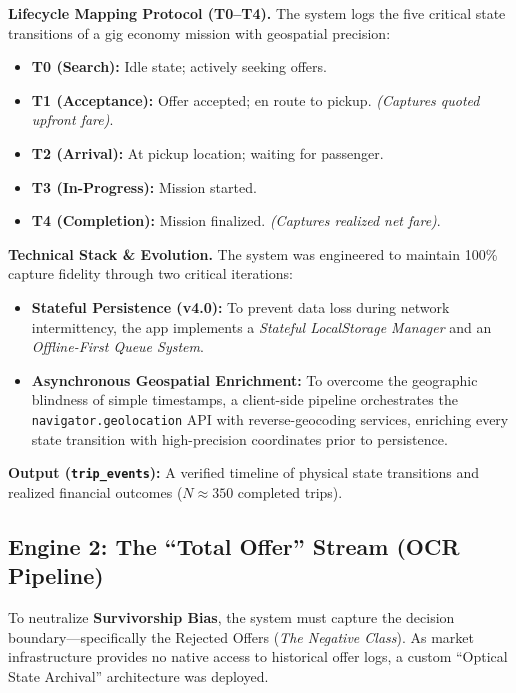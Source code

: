 \medskip
\noindent \textbf{Lifecycle Mapping Protocol (T0--T4).} The system logs the five critical state transitions of a gig economy mission with geospatial precision:
\begin{itemize}[noitemsep, topsep=3pt]
    \item \textbf{T0 (Search):} Idle state; actively seeking offers.
    \item \textbf{T1 (Acceptance):} Offer accepted; en route to pickup. \textit{(Captures quoted upfront fare)}.
    \item \textbf{T2 (Arrival):} At pickup location; waiting for passenger.
    \item \textbf{T3 (In-Progress):} Mission started.
    \item \textbf{T4 (Completion):} Mission finalized. \textit{(Captures realized net fare)}.
\end{itemize}

\medskip
\noindent \textbf{Technical Stack \& Evolution.} The system was engineered to maintain 100\% capture fidelity through two critical iterations:
\begin{itemize}[noitemsep, topsep=3pt]
    \item \textbf{Stateful Persistence (v4.0):} To prevent data loss during network intermittency, the app implements a \textit{Stateful LocalStorage Manager} and an \textit{Offline-First Queue System}. 
    \item \textbf{Asynchronous Geospatial Enrichment:} To overcome the geographic blindness of simple timestamps, a client-side pipeline orchestrates the \texttt{navigator.geolocation} API with reverse-geocoding services, enriching every state transition with high-precision coordinates prior to persistence.
\end{itemize}

\noindent \textbf{Output (\texttt{trip\_events}):} A verified timeline of physical state transitions and realized financial outcomes ($N \approx 350$ completed trips).

\subsection{Engine 2: The ``Total Offer'' Stream (OCR Pipeline)}
To neutralize \textbf{Survivorship Bias}, the system must capture the decision boundary—specifically the Rejected Offers (\textit{The Negative Class}). As market infrastructure provides no native access to historical offer logs, a custom ``Optical State Archival'' architecture was deployed.

